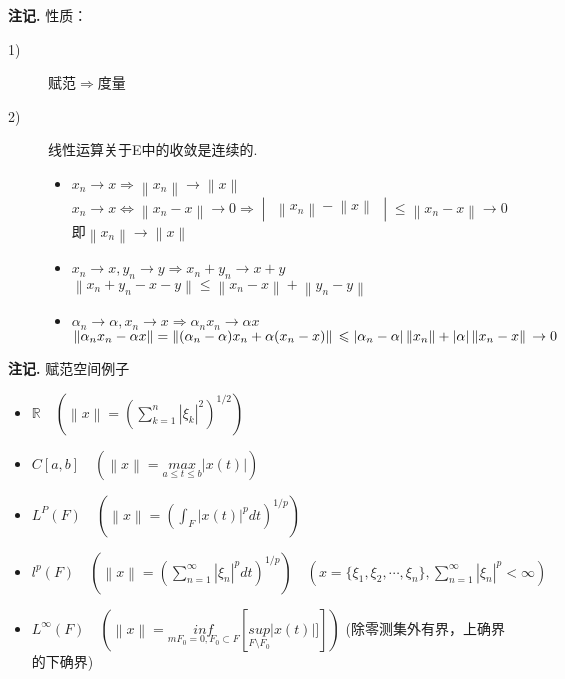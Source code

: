 \documentclass[12pt, a4paper, oneside]{ctexbook}
\newenvironment{note}{\par\noindent\textbf{注记. }}{\par}
\begin{document}
\begin{note}
	性质：\begin{description}
		\item[1)] 赋范$\Rightarrow$度量
		\item[2)] 线性运算关于E中的收敛是连续的.
		\begin{itemize}
			\item $x_n\to x \Rightarrow \left \| x_n\right \|\to \left \| x\right \|$\\
			$x_n\to x \Leftrightarrow \left \| x_n-x\right \|\to 0 \Rightarrow \begin{vmatrix}
				\left \| x_n\right \|-\left \| x\right \|
			\end{vmatrix}\leqslant \left \| x_n-x\right \|\to 0$\\
		即$\left \| x_n\right \|\to \left \| x\right \|$
		\item $x_n\to x,y_n\to y\Rightarrow x_n+y_n\to x+y$\\
		$\left \| x_n+y_n-x-y\right \|\leqslant \left \| x_n-x\right \|+\left \| y_n-y\right \|$
		\item $\alpha _n\to \alpha,x_n\to x \Rightarrow \alpha_n x_n\to \alpha x$\\
	$
			\left \| \alpha_nx_n-\alpha x\right \|=\left \| (\alpha_n-\alpha)x_n+\alpha(x_n-x)\right \|\\
			\leqslant \left | \alpha_n -\alpha\right |\left \| x_n\right \|+\left | \alpha\right |\left \| x_n-x\right \|\\
			\to 0
$
		\end{itemize}
	\end{description}
\end{note}
\begin{note}
	赋范空间例子\\ 
	\begin{itemize}
		\item $\mathbb{R}\quad (\left \| x\right \|=(\sum_{k=1}^{n}\left | \xi _k\right |^2)^{1/2})$
		\item $C[a,b]\quad (\left \| x\right \|=\underset{a\leqslant t\leqslant b}{max}\left | x(t)\right |)$
		\item $L^P(F)\quad (\left \| x\right \|=(\int _F\left | x(t)\right |^pdt)^{1/p})$
		\item $l^p(F) \quad (\left \| x\right \|=(\sum_{n=1}^{\infty}\left | \xi_n\right |^pdt)^{1/p}) \quad (x=\{\xi _1,\xi_2,\cdots, \xi_n\},\sum_{n=1}^{\infty}\left | \xi_n\right |^p<\infty)$
		\item $L^{\infty}(F)\quad (\left \| x\right \|=\underset{mF_0=0,F_0\subset F}{inf}\left[\underset{F\setminus F_0}{sup}\left | x(t)\right |]\right])$
(除零测集外有界，上确界的下确界)
	\end{itemize}
\end{note}
\end{document}
